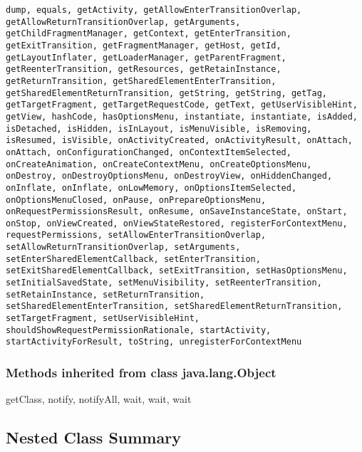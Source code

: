 \begin{lstlisting}
dump, equals, getActivity, getAllowEnterTransitionOverlap, getAllowReturnTransitionOverlap, getArguments, getChildFragmentManager, getContext, getEnterTransition, getExitTransition, getFragmentManager, getHost, getId, getLayoutInflater, getLoaderManager, getParentFragment, getReenterTransition, getResources, getRetainInstance, getReturnTransition, getSharedElementEnterTransition, getSharedElementReturnTransition, getString, getString, getTag, getTargetFragment, getTargetRequestCode, getText, getUserVisibleHint, getView, hashCode, hasOptionsMenu, instantiate, instantiate, isAdded, isDetached, isHidden, isInLayout, isMenuVisible, isRemoving, isResumed, isVisible, onActivityCreated, onActivityResult, onAttach, onAttach, onConfigurationChanged, onContextItemSelected, onCreateAnimation, onCreateContextMenu, onCreateOptionsMenu, onDestroy, onDestroyOptionsMenu, onDestroyView, onHiddenChanged, onInflate, onInflate, onLowMemory, onOptionsItemSelected, onOptionsMenuClosed, onPause, onPrepareOptionsMenu, onRequestPermissionsResult, onResume, onSaveInstanceState, onStart, onStop, onViewCreated, onViewStateRestored, registerForContextMenu, requestPermissions, setAllowEnterTransitionOverlap, setAllowReturnTransitionOverlap, setArguments, setEnterSharedElementCallback, setEnterTransition, setExitSharedElementCallback, setExitTransition, setHasOptionsMenu, setInitialSavedState, setMenuVisibility, setReenterTransition, setRetainInstance, setReturnTransition, setSharedElementEnterTransition, setSharedElementReturnTransition, setTargetFragment, setUserVisibleHint, shouldShowRequestPermissionRationale, startActivity, startActivityForResult, toString, unregisterForContextMenu
\end{lstlisting}

\subsubsection{Methods inherited from class java.lang.Object}
getClass, notify, notifyAll, wait, wait, wait






\subsection{Nested Class Summary}
\begin{DoxyCompactList}
\item{}
\item{}
\end{DoxyCompactList}



